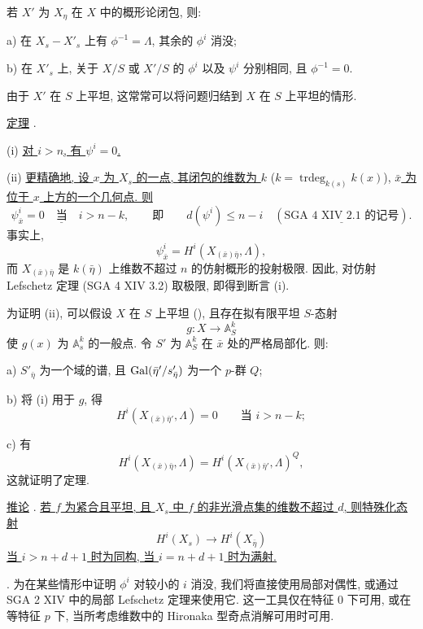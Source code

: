 若 $X'$ 为 $X_\eta$ 在 $X$ 中的概形论闭包, 则:

a) 在 $X_s-X'_s$ 上有 $\phi^{-1}=\Lambda$, 其余的 $\phi^i$ 消没;


b) 在 $X'_s$ 上, 关于 $X/S$ 或 $X'/S$ 的 $\phi^i$ 以及 $\psi^i$ 分别相同, 且 $\phi^{-1}=0$.

由于 $X'$ 在 $S$ 上平坦, 这常常可以将问题归结到 $X$ 在 $S$ 上平坦的情形.

\underline{定理} .

(i) \underline{对 $i>n$, 有 $\psi^i=0$.}

(ii) \underline{更精确地, 设 $x$ 为 $X_s$ 的一点, 其闭包的维数为 $k$} ($k=\operatorname{trdeg}_{k(s)}k(x)$), \underline{$\bar x$ 为位于 $x$ 上方的一个几何点. 则}
\begin{equation*}
\psi^i_{\bar x}=0
\quad\underline{\text{当}}\quad i>n-k,
\qquad\text{即}\qquad
d(\psi^i)\leqslant n-i
\quad(\underline{\text{SGA 4 XIV 2.1 的记号}}).
\end{equation*}
事实上,
\[
\psi^i_{\bar x}=H^i(X_{(\bar x)\bar\eta},\Lambda),
\]
而 $X_{(\bar x)\bar\eta}$ 是 $k(\bar\eta)$ 上维数不超过 $n$ 的仿射概形的投射极限. 因此, 对仿射 Lefschetz 定理 (SGA 4 XIV 3.2) 取极限, 即得到断言 (i).

为证明 (ii), 可以假设 $X$ 在 $S$ 上平坦 (), 且存在拟有限平坦 $S$-态射
\[
g:X\longrightarrow\mathbb A^k_S
\]
使 $g(x)$ 为 $\mathbb A^k_s$ 的一般点. 令 $S'$ 为 $\mathbb A^k_S$ 在 $\bar x$ 处的严格局部化. 则:

a) $S'_{\bar\eta}$ 为一个域的谱, 且 $\operatorname{Gal}(\bar\eta'/s'_{\bar\eta})$ 为一个 $p$-群 $Q$;

b) 将 (i) 用于 $g$, 得
\[
H^i(X_{(\bar x)\bar\eta'},\Lambda)=0
\qquad\text{当 }i>n-k;
\]

c) 有
\[
H^i(X_{(\bar x)\bar\eta},\Lambda)
=H^i(X_{(\bar x)\bar\eta'},\Lambda)^Q,
\]
这就证明了定理.

\underline{推论} . \underline{若 $f$ 为紧合且平坦, 且 $X_s$ 中 $f$ 的非光滑点集的维数不超过 $d$, 则特殊化态射}
\[
H^i(X_s)\longrightarrow H^i(X_{\bar\eta})
\]
\underline{当 $i>n+d+1$ 时为同构, 当 $i=n+d+1$ 时为满射.}

. 为在某些情形中证明 $\phi^i$ 对较小的 $i$ 消没, 我们将直接使用局部对偶性, 或通过 SGA 2 XIV 中的局部 Lefschetz 定理来使用它. 这一工具仅在特征 $0$ 下可用, 或在等特征 $p$ 下, 当所考虑维数中的 Hironaka 型奇点消解可用时可用.


